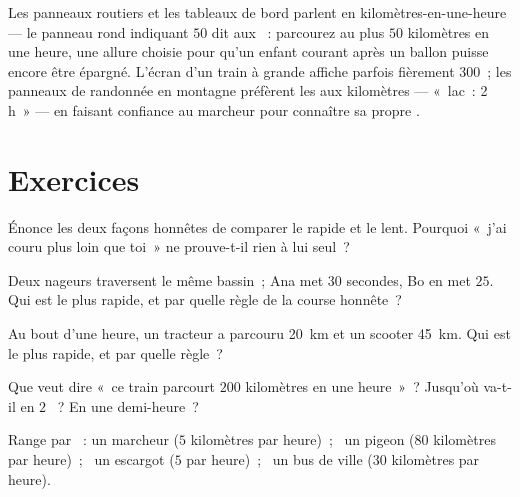 \begin{example}\label{ex:g5:speed-distance-time:signs}
Les panneaux routiers et les tableaux de bord parlent en
kilomètres-en-une-heure --- le panneau rond indiquant $50$ dit aux
~: parcourez au plus $50$ kilomètres en une heure, une
allure choisie pour qu'un enfant courant après un ballon puisse
encore être épargné. L'écran d'un train à grande  affiche
parfois fièrement $300$~; les panneaux de randonnée en montagne
préfèrent les  aux kilomètres --- «~lac~: 2 h~» --- en faisant
confiance au marcheur pour connaître sa propre .
\end{example}

\section{Exercices}

\begin{exercise}[$\star$]\label{exo:g5:speed-distance-time:1}
Énonce les deux façons honnêtes de comparer le rapide et le lent.
Pourquoi «~j'ai couru plus loin que toi~» ne prouve-t-il rien à lui
seul~?
\end{exercise}

\begin{exercise}[$\star$]\label{exo:g5:speed-distance-time:2}
Deux nageurs traversent le même bassin~; Ana met $30$ secondes, Bo en
met $25$. Qui est le plus rapide, et par quelle règle de la course
honnête~?
\end{exercise}

\begin{exercise}[$\star$]\label{exo:g5:speed-distance-time:3}
Au bout d'une heure, un tracteur a parcouru \qty{20}{km} et un
scooter \qty{45}{km}. Qui est le plus rapide, et par quelle règle~?
\end{exercise}

\begin{exercise}[$\star$]\label{exo:g5:speed-distance-time:4}
Que veut dire «~ce train parcourt $200$ kilomètres en une heure~»~?
Jusqu'où va-t-il en $2$ ~? En une demi-heure~?
\end{exercise}

\begin{exercise}[$\star$]\label{exo:g5:speed-distance-time:5}
Range par ~: un marcheur ($5$ kilomètres par heure)~; \ un
pigeon ($80$ kilomètres par heure)~; \ un escargot ($5$
\emph{} par heure)~; \ un bus de ville ($30$ kilomètres par
heure).
\end{exercise}


